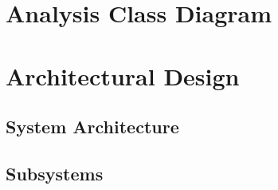\documentclass[titlepage]{article}
\begin{document}

\section{Analysis Class Diagram}
\label{sec:analysis_class_diagram}



\section{Architectural Design}
\label{sec:architectural_design}


\subsection{System Architecture}
\label{sub:system_architecture}



\subsection{Subsystems}
\label{sub:subsystems}

\end{document}
